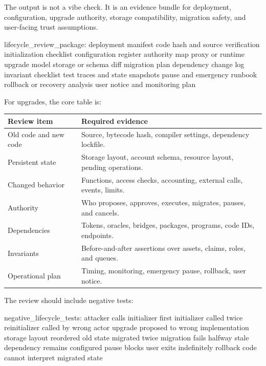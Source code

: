 \begin{artifactbox}
The output is not a vibe check. It is an evidence bundle for deployment, configuration, upgrade authority, storage compatibility, migration safety, and user-facing trust assumptions.
\end{artifactbox}

\begin{codeblock}
lifecycle_review_package:
    deployment manifest
    code hash and source verification
    initialization checklist
    configuration register
    authority map
    proxy or runtime upgrade model
    storage or schema diff
    migration plan
    dependency change log
    invariant checklist
    test traces and state snapshots
    pause and emergency runbook
    rollback or recovery analysis
    user notice and monitoring plan
\end{codeblock}

For upgrades, the core table is:

\begin{table}[htbp]
\centering
\small
\renewcommand{\arraystretch}{1.15}
\begin{tabularx}{\textwidth}{@{}>{\RaggedRight\arraybackslash}p{}X@{}}
\toprule
Review item & Required evidence \\
\midrule
Old code and new code & Source, bytecode hash, compiler settings, dependency lockfile. \\
Persistent state & Storage layout, account schema, resource layout, pending operations. \\
Changed behavior & Functions, access checks, accounting, external calls, events, limits. \\
Authority & Who proposes, approves, executes, migrates, pauses, and cancels. \\
Dependencies & Tokens, oracles, bridges, packages, programs, code IDs, endpoints. \\
Invariants & Before-and-after assertions over assets, claims, roles, and queues. \\
Operational plan & Timing, monitoring, emergency pause, rollback, user notice. \\
\bottomrule
\end{tabularx}
\end{table}

The review should include negative tests:

\begin{codeblock}
negative_lifecycle_tests:
    attacker calls initializer first
    initializer called twice
    reinitializer called by wrong actor
    upgrade proposed to wrong implementation
    storage layout reordered
    old state migrated twice
    migration fails halfway
    stale dependency remains configured
    pause blocks user exits indefinitely
    rollback code cannot interpret migrated state
\end{codeblock}

